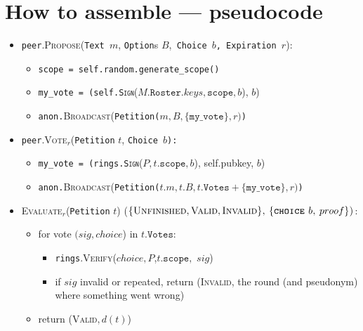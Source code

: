 \documentclass[twocolumn]{article}
\numberwithin{equation}{section}
\numberwithin{figure}{section}
\begin{document}




\section{How to assemble --- pseudocode}
\begin{itemize}
\item \texttt{peer}\textsc{.Propose}(\texttt{Text $m$}, \texttt{Option}s
$B$,\texttt{ Choice $b$, Expiration }$r$):

\begin{itemize}
\item \texttt{scope = self.random.generate\_scope()}
\item \texttt{my\_vote = (self.}\texttt{\textsc{Sign}}($M.\texttt{Roster}.keys,\mathtt{scope},b$),
$b$)
\item \texttt{anon.}\textsc{Broadcast}(\texttt{Petition($m,B,\{\mathtt{my\_vote}\},r)$)}
\end{itemize}
\item \texttt{peer}\textsc{.Vote}$_{r}$(\texttt{Petition} $t$, \texttt{Choice
$b$):}

\begin{itemize}
\item \texttt{my\_vote = (rings.}\texttt{\textsc{Sign}}($P,t.\mathtt{scope},b$),
self.pubkey, $b$)
\item \texttt{anon.}\textsc{Broadcast}(\texttt{Petition($t.m,t.B,t.\mathtt{Votes}+\{\mathtt{my\_vote}\},r)$)}
\end{itemize}
\item \textsc{Evaluate}$_{r}$(\texttt{Petition} $t$) ($\{\textsc{Unfinished},\textsc{Valid},\textsc{Invalid\}, \{\texttt{choice} \ensuremath{b}, \ensuremath{proof}\})}$:

\begin{itemize}
\item for vote $(sig,choice$) in $t.\mathtt{Votes}$:

\begin{itemize}
\item \texttt{rings}.\textsc{Verify}($choice,$$P$,$t.\mathtt{scope},$
$sig$)
\item if $sig$ invalid or repeated, return \textsc{(Invalid, }the round
(and pseudonym) where something went wrong)
\end{itemize}
\item return (\textsc{Valid}$,d(t)$)\end{itemize}
\end{itemize}
\end{document}
